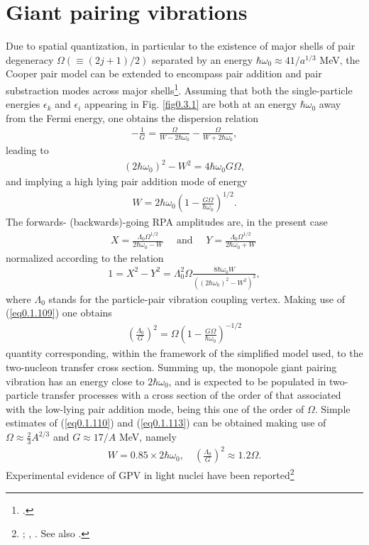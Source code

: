 \section{Giant pairing vibrations}\label{Sect2.6}
Due to spatial quantization, in particular to the existence of major shells of pair degeneracy $\Omega(\equiv(2j+1)/2)$ separated by an energy $\hbar\omega_0\approx41/a^{1/3}$ MeV, the Cooper pair model can be extended to encompass pair addition and pair substraction modes across major shells\footnote{\cite{Broglia:77}.}. Assuming that both the single-particle energies $\epsilon_k$ and $\epsilon_i$ appearing in Fig. \ref{fig0.3.1} are both at an energy    $\hbar\omega_0$ away from the Fermi energy, one obtains the dispersion relation 
\begin{align}\label{eq0.1.108}
-\frac{1}{G}=\frac{\Omega}{W-2\hbar\omega_0}-\frac{\Omega}{W+2\hbar\omega_0},
\end{align}
leading to
\begin{align}\label{eq0.1.109}
(2\hbar\omega_0)^2-W^2=4\hbar\omega_0G\Omega,
\end{align}
and implying a high lying pair addition mode of energy
\begin{align}\label{eq0.1.110}
W=2\hbar\omega_0\left(1-\frac{G\Omega}{\hbar\omega_0}\right)^{1/2}.
\end{align}
The forwards- (backwards)-going RPA amplitudes are, in the present case
\begin{align}\label{eq0.1.111}
X=\frac{\Lambda_0\Omega^{1/2}}{2\hbar\omega_0-W}\quad\text{ and      }\quad Y=\frac{\Lambda_0\Omega^{1/2}}{2\hbar\omega_0+W}\
\end{align}
normalized according to the relation 
\begin{align}\label{eq0.1.112}
1=X^2-Y^2=\Lambda^2_0\Omega\frac{8\hbar\omega_0W}{\left((2\hbar\omega_0)^2-W^2\right)^2},
\end{align}
where $\Lambda_0$ stands for the particle-pair vibration coupling vertex. Making use of (\ref{eq0.1.109}) one obtains
\begin{align}\label{eq0.1.113}
\left(\frac{\Lambda_0}{G}\right)^2=\Omega\left(1-\frac{G\Omega}{\hbar\omega_0}\right)^{-1/2}
\end{align}
quantity corresponding, within the framework of the simplified model used, to the two-nucleon transfer cross section. Summing up, the monopole giant pairing vibration has an energy close to $2\hbar\omega_0$, and is expected to be populated in two-particle transfer processes with a cross section of the order of that associated with the low-lying pair addition mode, being this one of the order of $\Omega$. Simple estimates of (\ref{eq0.1.110}) and (\ref{eq0.1.113}) can be obtained making use of $\Omega\approx\frac{2}{3}A^{2/3}$
and $G\approx17/A$ MeV, namely 
\begin{align}\label{eq0.1.114}
W=0.85\times2\hbar\omega_0,\quad\left(\frac{\Lambda_0}{G}\right)^2\approx1.2 \Omega.
\end{align}
Experimental evidence of GPV in light nuclei have been reported\footnote{\cite{Cappuzzello:15}; \cite{Cavallaro:19},  \cite{Bortignon:16}. See also \cite{Laskin:16,Betan:02,Dussel:09,Mouginot:11,Khan:04,Avez:08,Khan:09,Dasso:15,Fortunato:02,Herzog:86,Betan:02}.}

